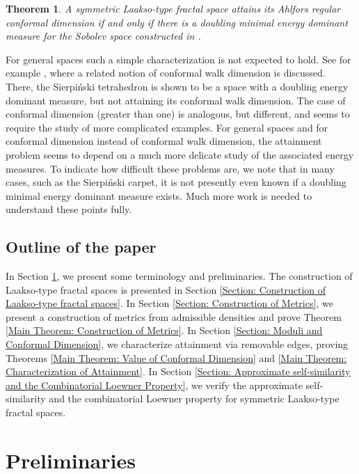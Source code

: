 \documentclass{amsart}
\newtheorem{theorem}[equation]{Theorem}
\numberwithin{equation}{section}
\theoremstyle{definition}
\theoremstyle{remark}
\begin{document}
\begin{theorem}
    A symmetric Laakso-type fractal space attains its Ahlfors regular conformal dimension if and only if there is a doubling minimal energy dominant measure for the Sobolev space constructed in \cite{ASEBShimizu}.
\end{theorem}

For general spaces such a simple characterization is not expected to hold. See for example \cite{MN}, where a related notion of conformal walk dimension is discussed. There, the Sierpi\'nski tetrahedron is shown to be a space with a doubling energy dominant measure, but not attaining its conformal walk dimension. The case of conformal dimension (greater than one) is analogous, but different, and seems to require the study of more complicated examples. For general spaces and for conformal dimension instead of conformal walk dimension, the attainment problem seems to depend on a much more delicate study of the associated energy measures. To indicate how difficult these problems are, we note that in many cases, such as the Sierpi\'nski carpet, it is not presently even known if a doubling minimal energy dominant measure exists. Much more work is needed to understand these points fully. 

\subsection{Outline of the paper}

In Section \ref{Section: Preliminaries}, we present some terminology and preliminaries. The construction of Laakso-type fractal spaces is presented in Section \ref{Section: Construction of Laakso-type fractal spaces}. In Section \ref{Section: Construction of Metrics}, we present a construction of metrics from admissible densities and prove Theorem \ref{Main Theorem: Construction of Metrics}. In Section \ref{Section: Moduli and Conformal Dimension}, we characterize attainment via removable edges, proving Theorems \ref{Main Theorem: Value of Conformal Dimension} and \ref{Main Theorem: Characterization of Attainment}. In Section \ref{Section: Approximate self-similarity and the Combinatorial Loewner Property}, we verify the approximate self-similarity and the combinatorial Loewner property for symmetric Laakso-type fractal spaces. 


\section{Preliminaries}\label{Section: Preliminaries}
\end{document}
